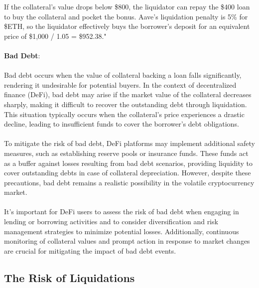 \documentclass{article}
\begin{document}
If the collateral’s value drops below \$800, the liquidator can repay the \$400 loan to buy the collateral and pocket the bonus. Aave’s liquidation penalty is 5\% for \$ETH, so the liquidator effectively buys the borrower’s deposit for an equivalent price of \$1,000 / 1.05 = \$952.38."\\\\\textbf{Bad Debt}:\\\\Bad debt occurs when the value of collateral backing a loan falls significantly, rendering it undesirable for potential buyers. In the context of decentralized finance (DeFi), bad debt may arise if the market value of the collateral decreases sharply, making it difficult to recover the outstanding debt through liquidation. This situation typically occurs when the collateral's price experiences a drastic decline, leading to insufficient funds to cover the borrower's debt obligations.\\\\To mitigate the risk of bad debt, DeFi platforms may implement additional safety measures, such as establishing reserve pools or insurance funds. These funds act as a buffer against losses resulting from bad debt scenarios, providing liquidity to cover outstanding debts in case of collateral depreciation. However, despite these precautions, bad debt remains a realistic possibility in the volatile cryptocurrency market.\\\\It's important for DeFi users to assess the risk of bad debt when engaging in lending or borrowing activities and to consider diversification and risk management strategies to minimize potential losses. Additionally, continuous monitoring of collateral values and prompt action in response to market changes are crucial for mitigating the impact of bad debt events.
\subsection{The Risk of Liquidations}
\end{document}
